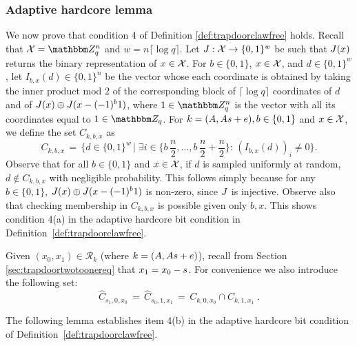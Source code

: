 \subsubsection{Adaptive hardcore lemma}
\label{sec:hc-lemma}
We now prove that condition 4 of Definition \ref{def:trapdoorclawfree} holds. 
Recall that $\sX=\mZ_q^n$ and $w=n\lceil \log q \rceil$. Let $J:\mathcal{X}\to\{0,1\}^w$  be such that $J(x)$ returns the binary representation of $x\in\mathcal{X}$. For $b\in\{0,1\}$, $x\in \mathcal{X}$, and $d\in\{0,1\}^w$, let
 $I_{b,x}(d) \in \{0,1\}^n$ be the vector whose each coordinate is obtained by taking the inner product mod $2$ of the corresponding block of $\lceil\log q\rceil$ coordinates of $d$ and of $\inj(x)\oplus \inj(x-(-1)^b\*1 )$, where $\*1 \in \mZ_q^n$ is the vector with all its coordinates equal to $1\in\mZ_q$. For $k = (\*A,\*A\*s + \*e), b\in\{0,1\}$ and $x\in\mathcal{X}$, we define the set $C_{k,b,x}$ as 
$$ C_{k,b,x}\,=\,\Big\{d\in \{0,1\}^w\,\Big|\; \exists i\in\Big\{b\,\frac{n}{2},\ldots,b\,\frac{n}{2}+\frac{n}{2}\Big\}:\,(I_{b,x}(d))_i \neq 0 \Big\}.$$
Observe that for all $b\in \{0,1\}$ and $x\in \mathcal{X}$, if $d$ is sampled uniformly at random, $d\notin C_{k,b,x}$ with negligible probability. This follows simply because for any $b\in\{0,1\}$, $\inj(x)\oplus \inj(x-(-1)^b\*1)$ is non-zero, since $J$ is injective. Observe also that checking membership in $C_{k,b,x}$ is possible given only $b,x$. This shows condition 4(a) in the adaptive hardcore bit condition in Definition~\ref{def:trapdoorclawfree}.

Given $(x_0,x_1)\in\mathcal{R}_k$ (where $k = (\*A,\*A\*s + \*e)$), recall from Section \ref{sec:trapdoortwotoonereq} that $x_1 = x_0 - \*s$. For convenience we also introduce the following set: 
\begin{equation}\label{eq:def-hatc}
\hat{C}_{s_1,0,x_0} \,=\, \hat{C}_{s_0,1,x_1}\,=\, C_{k,0,x_0}\cap C_{k,1,x_1}\;.
\end{equation}

The following lemma establishes item 4(b) in the adaptive hardcore bit condition of Definition~\ref{def:trapdoorclawfree}. 

